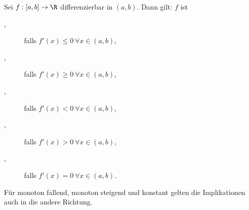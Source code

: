 Sei $f: [a, b] \to \R$ differenzierbar in $(a, b)$. Dann gilt: $f$ ist
\begin{description}
    \item[,] falls $f'(x) \leq 0 \ \forall x \in (a, b)$,
    \item[,] falls $f'(x) \geq 0 \ \forall x \in (a, b)$,
    \item[,] falls $f'(x) < 0 \ \forall x \in (a, b)$,
    \item[,] falls $f'(x) > 0 \ \forall x \in (a, b)$,
    \item[,] falls $f'(x) = 0 \ \forall x \in (a, b)$.
\end{description}
Für monoton fallend, monoton steigend und konstant gelten die Implikationen auch in die andere Richtung.